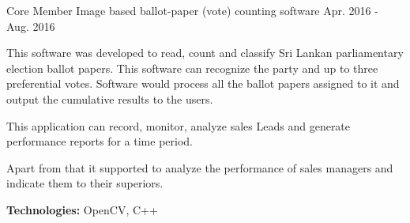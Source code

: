 \begin{cventries}
  \cventry
    {Core Member} %
    {Image based ballot-paper (vote) counting software } %
    {} %
    {Apr. 2016 - Aug. 2016} %
    {
      \begin{cvitems} %
        \item {This software was developed to read, count and classify Sri Lankan parliamentary election ballot papers. This software can recognize the party and up to three preferential votes. Software would process all the ballot papers assigned to it and output the cumulative results to the users.}
        \item {This application can record, monitor, analyze sales Leads and generate performance reports for a time period.}
        \item {Apart from that it supported to analyze the performance of sales managers and indicate them to their superiors.}
        \item {\textbf{Technologies: } OpenCV, C++}
      \end{cvitems}
    }

\end{cventries}
